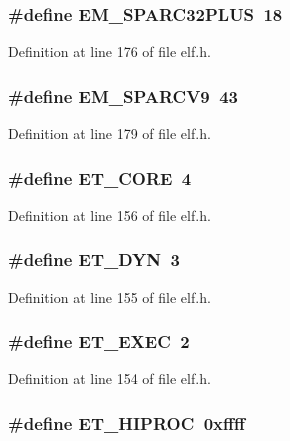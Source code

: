 \subsubsection[{EM\_\-SPARC32PLUS}]{\setlength{\rightskip}{0pt plus 5cm}\#define EM\_\-SPARC32PLUS~18}\label{elf_8h_cb4e795071e36755d6e84361bc83f94d}




Definition at line 176 of file elf.h.
\subsubsection[{EM\_\-SPARCV9}]{\setlength{\rightskip}{0pt plus 5cm}\#define EM\_\-SPARCV9~43}\label{elf_8h_d3be48b70ed10f4f1a70e1fca938d970}




Definition at line 179 of file elf.h.
\subsubsection[{ET\_\-CORE}]{\setlength{\rightskip}{0pt plus 5cm}\#define ET\_\-CORE~4}\label{elf_8h_2b9430d26ba60f7a9d65c8d43e54f213}




Definition at line 156 of file elf.h.
\subsubsection[{ET\_\-DYN}]{\setlength{\rightskip}{0pt plus 5cm}\#define ET\_\-DYN~3}\label{elf_8h_4373ea3b3d512434ebe2213829b6751b}




Definition at line 155 of file elf.h.
\subsubsection[{ET\_\-EXEC}]{\setlength{\rightskip}{0pt plus 5cm}\#define ET\_\-EXEC~2}\label{elf_8h_942478985eb016311380dee473cc8c3e}




Definition at line 154 of file elf.h.
\subsubsection[{ET\_\-HIPROC}]{\setlength{\rightskip}{0pt plus 5cm}\#define ET\_\-HIPROC~0xffff}\label{elf_8h_77894d49f8672fee77686cc7f7ba1a1a}




